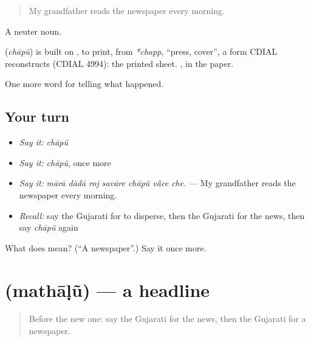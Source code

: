 \begin{quote}
My grandfather reads the newspaper every morning.
\end{quote}

A neuter noun.

\begin{cousinweb}
\textbf{} (\emph{chāpũ}) is built on \textbf{}, to print, from \emph{*chapp}, \textquotedblleft{}press, cover\textquotedblright{}, a form CDIAL reconstructs (CDIAL 4994): the printed sheet. \textbf{}, in the paper.
\end{cousinweb}

\begin{grammarlens}[title={What you've built}]
One more word for telling what happened.
\end{grammarlens}

\subsection*{Your turn}
\begin{itemize}
\raggedright
  \item \emph{Say it:} \emph{chāpũ}
  \item \emph{Say it:} \emph{chāpũ}, once more
  \item \emph{Say it:} \emph{mārā dādā roj savāre chāpũ vā̃ce che.} — My grandfather reads the newspaper every morning.
  \item \emph{Recall:} say the Gujarati for to disperse, then the Gujarati for the news, then say \emph{chāpũ} again
\end{itemize}

\begin{tcolorbox}[breakable,colback=teal!4,colframe=teal!35!black,title={Before you move on}]
What does  mean? (\textquotedblleft{}A newspaper\textquotedblright{}.) Say it once more.
\end{tcolorbox}
\section[\texorpdfstring{\gu{મથાળું} (mathāḷũ)}{મથાળું (mathāḷũ)}]{ (mathāḷũ) — a headline}

\label{lesson:GU-C311-mathalu}



\begin{quote}
Before the new one: say the Gujarati for the news, then the Gujarati for a newspaper.
\end{quote}

